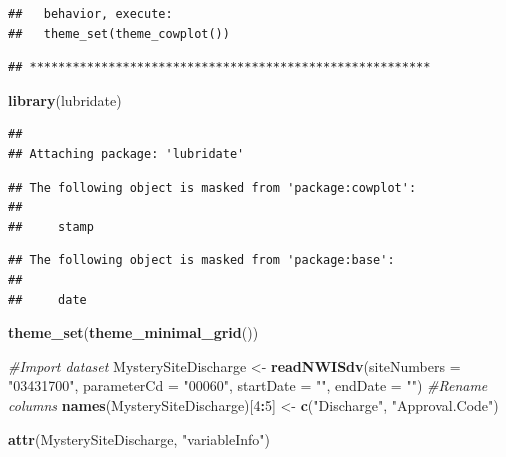 \documentclass[]{article}
\newenvironment{Shaded}{\begin{snugshade}}{\end{snugshade}}
\newcommand{\CommentTok}[1]{\textcolor[rgb]{0.56,0.35,0.01}{\textit{#1}}}
\newcommand{\DataTypeTok}[1]{\textcolor[rgb]{0.13,0.29,0.53}{#1}}
\newcommand{\DecValTok}[1]{\textcolor[rgb]{0.00,0.00,0.81}{#1}}
\newcommand{\KeywordTok}[1]{\textcolor[rgb]{0.13,0.29,0.53}{\textbf{#1}}}
\newcommand{\NormalTok}[1]{#1}
\newcommand{\OperatorTok}[1]{\textcolor[rgb]{0.81,0.36,0.00}{\textbf{#1}}}
\newcommand{\StringTok}[1]{\textcolor[rgb]{0.31,0.60,0.02}{#1}}
\begin{document}
\begin{verbatim}
##   behavior, execute:
##   theme_set(theme_cowplot())
\end{verbatim}

\begin{verbatim}
## ********************************************************
\end{verbatim}

\begin{Shaded}
\begin{Highlighting}[]
\KeywordTok{library}\NormalTok{(lubridate)}
\end{Highlighting}
\end{Shaded}

\begin{verbatim}
## 
## Attaching package: 'lubridate'
\end{verbatim}

\begin{verbatim}
## The following object is masked from 'package:cowplot':
## 
##     stamp
\end{verbatim}

\begin{verbatim}
## The following object is masked from 'package:base':
## 
##     date
\end{verbatim}

\begin{Shaded}
\begin{Highlighting}[]
\KeywordTok{theme_set}\NormalTok{(}\KeywordTok{theme_minimal_grid}\NormalTok{())}

\CommentTok{#Import dataset}
\NormalTok{MysterySiteDischarge <-}\StringTok{ }\KeywordTok{readNWISdv}\NormalTok{(}\DataTypeTok{siteNumbers =} \StringTok{"03431700"}\NormalTok{,}
                                  \DataTypeTok{parameterCd =} \StringTok{"00060"}\NormalTok{,}
                                  \DataTypeTok{startDate =} \StringTok{""}\NormalTok{,}
                                  \DataTypeTok{endDate =} \StringTok{""}\NormalTok{)}
\CommentTok{#Rename columns  }
\KeywordTok{names}\NormalTok{(MysterySiteDischarge)[}\DecValTok{4}\OperatorTok{:}\DecValTok{5}\NormalTok{] <-}\StringTok{ }\KeywordTok{c}\NormalTok{(}\StringTok{"Discharge"}\NormalTok{, }\StringTok{"Approval.Code"}\NormalTok{)}

\KeywordTok{attr}\NormalTok{(MysterySiteDischarge, }\StringTok{"variableInfo"}\NormalTok{)}
\end{Highlighting}
\end{Shaded}
\end{document}
